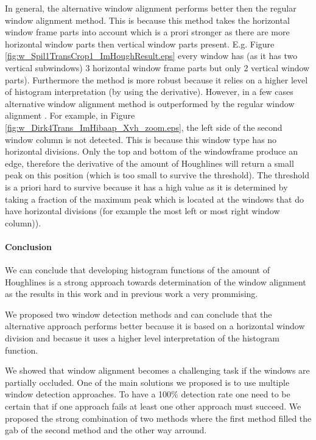 In general, the alternative window alignment performs better then the regular
window alignment method.  This is because this method takes the  horizontal
window frame parts into account which is a prori stronger as there are more
horizontal window parts then vertical window parts present.  E.g. Figure
\ref{fig:w_Spil1TransCrop1_ImHoughResult.eps} every window has (as it has two
vertical subwindows) 3 horizontal window frame parts but only 2 vertical window
parts).  Furthermore the method is more robust because it relies on a higher
level of histogram interpretation (by using the derivative).  However, in a few
cases alternative window alignment method is outperformed by the regular window
alignment . For example, in Figure
\ref{fig:w_Dirk4Trans_ImHibaap_Xvh_zoom.eps}, the left
side of the second window column is not detected.
This is because this window type has no horizontal divisions. Only the top and
bottom of the windowframe produce an edge, therefore the derivative of the
amount of Houghlines will return a small peak on this position (which is too
small to survive the threshold).  
The threshold is a priori hard to survive because it has a high value as it is
determined by taking a fraction of the maximum peak which is located at the
windows that do have horizontal divisions (for example the most left or most
right window column)). 



\paragraph{Conclusion}
We can conclude that developing histogram functions of the amount of Houghlines
is a strong approach towards determination of the window alignment as the
results in this work and in previous work a very prommising.

We proposed two window detection methods and can conclude that the alternative
approach performs better because it is based on a horizontal window division and
becasue it uses a higher level interpretation of the histogram function.

We showed that window alignment becomes a challenging task if the windows are partially
occluded.  One of the main solutions we proposed is to use multiple window
detection approaches.  To have a 100\% detection rate one need to be certain
that if one approach fails at least one other approach must succeed.  We
proposed the strong combination of two methods where the first method filled the
gab of the second method and the other way arround.

